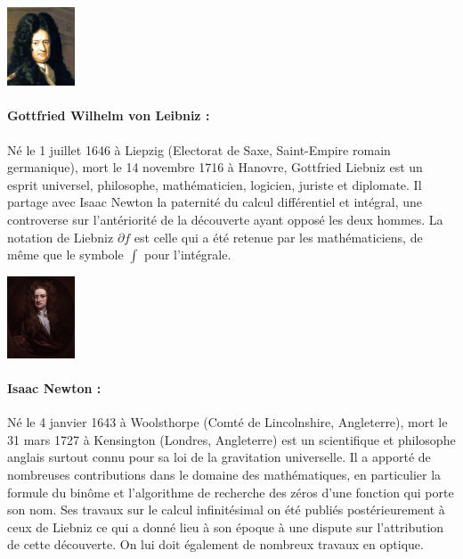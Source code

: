 \begin{minipage}{0.2\linewidth}
\begin{center}\includegraphics[width=2cm]{images/Gottfried_Wilhelm_von_Leibniz.jpg}\end{center}
\end{minipage}
\begin{minipage}{0.8 \linewidth}
\small{\paragraph*{Gottfried Wilhelm von Leibniz :} Né le 1 juillet 1646 à Liepzig (Electorat de Saxe, Saint-Empire romain germanique), mort le 14 novembre 1716 à Hanovre, Gottfried Liebniz est un esprit universel, philosophe, mathématicien, logicien, juriste et diplomate. Il partage avec Isaac Newton la paternité du calcul différentiel et intégral, une controverse sur l'antériorité de la découverte ayant opposé les deux hommes. La notation de Liebniz $\partial f$ est celle qui a été retenue par les mathématiciens, de même que le symbole $\int$ pour l'intégrale.}
\end{minipage}

\vfill
\begin{minipage}{0.2\linewidth}
\begin{center}\includegraphics[width=2cm]{images/isaac_newton.jpg}\end{center}
\end{minipage}
\begin{minipage}{0.8\linewidth}
\small{\paragraph*{Isaac Newton :} Né le  4 janvier 1643 à Woolsthorpe (Comté de Lincolnshire, Angleterre), mort le 31 mars 1727 à Kensington (Londres, Angleterre) est un scientifique et philosophe anglais surtout connu pour sa loi de la gravitation universelle. Il a apporté de nombreuses contributions dans le domaine des mathématiques, en particulier la formule du binôme et l'algorithme de recherche des zéros d'une fonction qui porte son nom. Ses travaux sur le calcul infinitésimal on été publiés postérieurement à ceux de Liebniz ce qui a donné lieu à son époque à une dispute sur l'attribution de cette découverte. On lui doit également de nombreux travaux en optique.}
\end{minipage}


